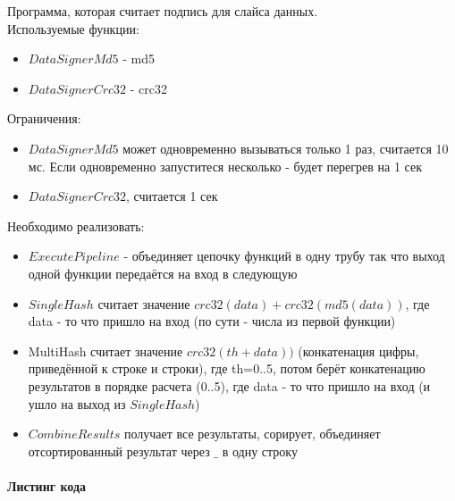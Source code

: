 \documentclass[utf8x, 12pt]{G7-32} %
\begin{document}
Программа, которая считает подпись для слайса данных.
\\
Используемые функции:
\begin{itemize}
	\item $DataSignerMd5$ - md5
	\item $DataSignerCrc32$ - crc32
\end{itemize}
Ограничения:
\begin{itemize}
	\item $DataSignerMd5$ может одновременно вызываться только 1 раз, считается 10 мс. Если одновременно запуститеся несколько - будет перегрев на 1 сек
	\item $DataSignerCrc32$, считается 1 сек
\end{itemize}
Необходимо реализовать:
\begin{itemize}
	\item $ExecutePipeline$ - объединяет цепочку функций в одну трубу так что выход одной функции передаётся на вход в следующую
	\item $SingleHash$ считает значение $crc32(data)+crc32(md5(data))$, где data - то что пришло на вход (по сути - числа из первой функции)
	\item MultiHash считает значение $crc32(th+data))$ (конкатенация цифры, приведённой к строке и строки), где th=0..5, потом берёт конкатенацию результатов в порядке расчета (0..5), где data - то что пришло на вход (и ушло на выход из $SingleHash$)
	\item $CombineResults$ получает все результаты, сорирует, объединяет отсортированный результат через $\_$ в одну строку
\end{itemize}

\newpage

\paragraph{Листинг кода}
\end{document}
